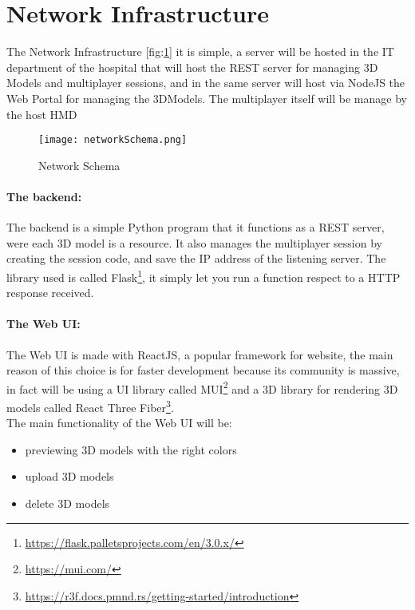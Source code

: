 \section{Network Infrastructure}
\noindent
The Network Infrastructure [fig:\ref{fig:NetworkSchema}] it is simple, a server will be hosted in the IT department of the hospital that will host the \ac{REST} server for managing 3D Models and multiplayer sessions,
and in the same server will host via NodeJS the Web Portal for managing the 3DModels.
The multiplayer itself will be manage by the host \ac{HMD}

\begin{figure}[h]
  \centering
  \texttt{[image: networkSchema.png]}
  \caption{Network Schema}
  \label{fig:NetworkSchema}
\end{figure}


\paragraph{The backend:}
The backend is a simple Python program that it functions as a \ac{REST} server, were each 3D model is a resource.
It also manages the multiplayer session by creating the session code, and save the \ac{IP} address of the listening server.
The library used is called Flask\footnote{\url{https://flask.palletsprojects.com/en/3.0.x/}}, it simply let you run a function respect to a \ac{HTTP} response received.

\paragraph{The Web UI:}
The Web \ac{UI} is made with ReactJS, a popular framework for website, the main reason of this choice is for faster development because its community is massive, in fact will be using a UI library called MUI\footnote{\url{https://mui.com/}}
and a 3D library for rendering 3D models called React Three Fiber\footnote{\url{https://r3f.docs.pmnd.rs/getting-started/introduction}}.\\
The main functionality of the Web \ac{UI} will be:
\begin{itemize}
  \item previewing 3D models with the right colors 
  \item upload 3D models
  \item delete 3D models
\end{itemize}


